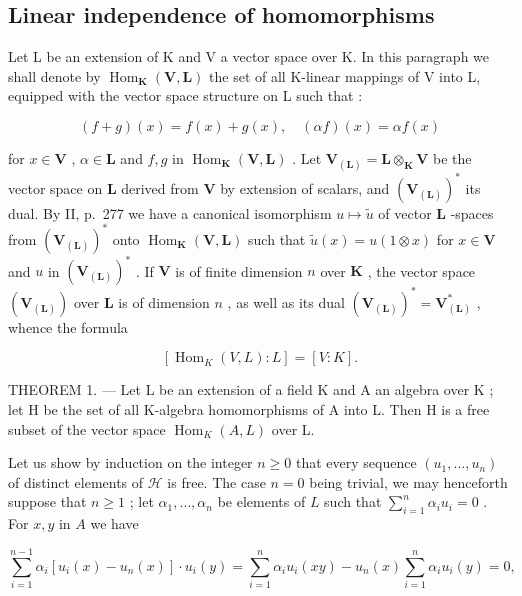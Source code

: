 \subsection{Linear independence of homomorphisms}

Let L be an extension of K and V a vector space over K. In this paragraph we shall denote by \(\operatorname{Hom}_{\mathbf{K}}(\mathbf{V},\mathbf{L})\) the set of all K-linear mappings of V into L, equipped with the vector space structure on L such that :

\[
(f + g) (x) = f (x) + g (x), \quad (\alpha f) (x) = \alpha f (x)\tag{1}
\]

for \(x \in \mathbf{V}\) , \(\alpha \in \mathbf{L}\) and \(f, g\) in \(\operatorname{Hom}_{\mathbf{K}}(\mathbf{V}, \mathbf{L})\) . Let \(\mathbf{V}_{(\mathbf{L})} = \mathbf{L} \otimes_{\mathbf{K}} \mathbf{V}\) be the vector space on \(\mathbf{L}\) derived from \(\mathbf{V}\) by extension of scalars, and \((\mathbf{V}_{(\mathbf{L})})^*\) its dual. By II, p.~277 we have a canonical isomorphism \(u \mapsto \tilde{u}\) of vector \(\mathbf{L}\) -spaces from \((\mathbf{V}_{(\mathbf{L})})^*\) onto \(\operatorname{Hom}_{\mathbf{K}}(\mathbf{V}, \mathbf{L})\) such that \(\tilde{u}(x) = u(1 \otimes x)\) for \(x \in \mathbf{V}\) and \(u\) in \((\mathbf{V}_{(\mathbf{L})})^*\) . If \(\mathbf{V}\) is of finite dimension \(n\) over \(\mathbf{K}\) , the vector space \((\mathbf{V}_{(\mathbf{L})})\) over \(\mathbf{L}\) is of dimension \(n\) , as well as its dual \((\mathbf{V}_{(\mathbf{L})})^* = \mathbf{V}_{(\mathbf{L})}^*\) , whence the formula

\[
[ \operatorname{Hom} _ {K} (V, L): L ] = [ V: K ].\tag{2}
\]

THEOREM 1. --- Let L be an extension of a field K and A an algebra over K ; let H be the set of all K-algebra homomorphisms of A into L. Then H is a free subset of the vector space \(\operatorname{Hom}_{K}(A, L)\) over L.

Let us show by induction on the integer \(n \geqslant 0\) that every sequence \((u_1, \ldots, u_n)\) of distinct elements of \(\mathcal{H}\) is free. The case \(n = 0\) being trivial, we may henceforth suppose that \(n \geqslant 1\) ; let \(\alpha_1, \ldots, \alpha_n\) be elements of \(L\) such that \(\sum_{i=1}^{n} \alpha_i u_i = 0\) . For \(x, y\) in \(A\) we have

\[
\sum_ {i = 1} ^ {n - 1} \alpha_ {i} [ u _ {i} (x) - u _ {n} (x) ] \cdot u _ {i} (y) = \sum_ {i = 1} ^ {n} \alpha_ {i} u _ {i} (x y) - u _ {n} (x) \sum_ {i = 1} ^ {n} \alpha_ {i} u _ {i} (y) = 0,
\]

